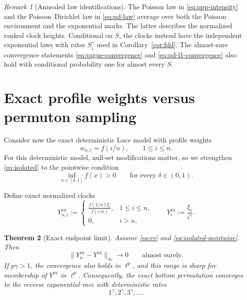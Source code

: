 \documentclass[11pt]{article}
\numberwithin{equation}{section}
\newtheorem{theorem}{Theorem}[section]
\theoremstyle{definition}
\theoremstyle{remark}
\newtheorem{remark}[theorem]{Remark}
\begin{document}
\begin{remark}[Annealed law identifications]
The Poisson law in \eqref{eq:ppp-intensity} and the Poisson--Dirichlet law
in \eqref{eq:pd-law} average over both the Poisson environment and the
exponential marks.  The latter describes the normalized ranked clock
heights.  Conditional on $S$, the clocks instead have the independent
exponential laws with rates $S_i^\gamma$ used in
Corollary~\ref{cor:fdd}.  The almost-sure convergence statements
\eqref{eq:vague-convergence} and \eqref{eq:pd-l1-convergence} also hold
with conditional probability one for almost every $S$.
\end{remark}

\section{Exact profile weights versus permuton sampling}
\label{sec:exact}

Consider now the exact deterministic Luce model with profile weights
\begin{equation}
  w_{n,i}=f(i/n),
  \qquad 1\leq i\leq n.
  \label{eq:exact-profile-weights}
\end{equation}
For this deterministic model, null-set modifications matter, so we strengthen \eqref{eq:isolated} to the pointwise condition
\begin{equation}
  \inf_{x\in[\delta,1]}f(x)>0
  \qquad\text{for every }\delta\in(0,1).
  \label{eq:isolated-pointwise}
\end{equation}

Define exact normalized clocks
\begin{equation}
  Y^{\mathrm{ex}}_{n,i}:=
  \begin{cases}
  \displaystyle
  \frac{f(1/n)\xi_i}{f(i/n)},&1\leq i\leq n,\\[1.2ex]
  0,&i>n,
  \end{cases}
  \qquad
  Y^{\mathrm{ex}}_i:=\frac{\xi_i}{i^\gamma}.
  \label{eq:exact-normalized-clocks}
\end{equation}

\begin{theorem}[Exact endpoint limit]
\label{thm:exact}
Assume \eqref{eq:rv} and \eqref{eq:isolated-pointwise}.  Then
\begin{equation}
  \|Y_n^{\mathrm{ex}}-Y^{\mathrm{ex}}\|_\infty\longrightarrow0
  \qquad\text{almost surely}.
  \label{eq:exact-c0}
\end{equation}
If $p\gamma>1$, the convergence also holds in $\ell^p$, and this range is sharp for membership of $Y^{\mathrm{ex}}$ in $\ell^p$.  Consequently, the exact bottom permutation converges to the reverse exponential race with deterministic rates
\begin{equation}
  1^\gamma,2^\gamma,3^\gamma,\ldots.
  \label{eq:deterministic-rate-environment}
\end{equation}
\end{theorem}
\end{document}
